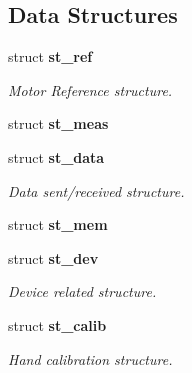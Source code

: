 \subsection*{Data Structures}
\begin{DoxyCompactItemize}
\item 
struct \textbf{ st\+\_\+ref}
\begin{DoxyCompactList}\small\item\em Motor Reference structure. \end{DoxyCompactList}\item 
struct \textbf{ st\+\_\+meas}
\item 
struct \textbf{ st\+\_\+data}
\begin{DoxyCompactList}\small\item\em Data sent/received structure. \end{DoxyCompactList}\item 
struct \textbf{ st\+\_\+mem}
\item 
struct \textbf{ st\+\_\+dev}
\begin{DoxyCompactList}\small\item\em Device related structure. \end{DoxyCompactList}\item 
struct \textbf{ st\+\_\+calib}
\begin{DoxyCompactList}\small\item\em Hand calibration structure. \end{DoxyCompactList}\end{DoxyCompactItemize}
